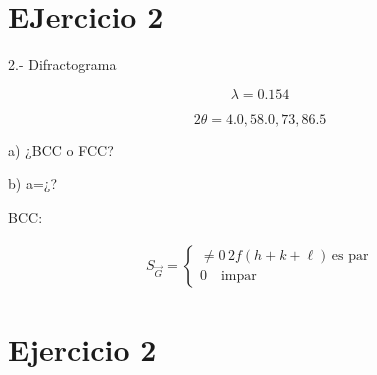 \documentclass{article}
\begin{document}
\section{EJercicio 2}

2.- Difractograma

\[ \lambda = 0\text{.}154 \]

\[ 2\theta = 4\text{.}0, 58\text{.}0, 73, 86\text{.}5 \]

a) ¿BCC o FCC?

b) a=¿?

BCC:

\begin{equation}
\begin{split}
S_{\vec{G}} = \left\{\begin{array}{c}
\neq 0 \, 2f (h+k+\ell) \, \text{es par}\\
0 \quad \text{impar} \end{array}  \right.
\end{split}
\end{equation} 

\section{Ejercicio 2} 
\end{document}
